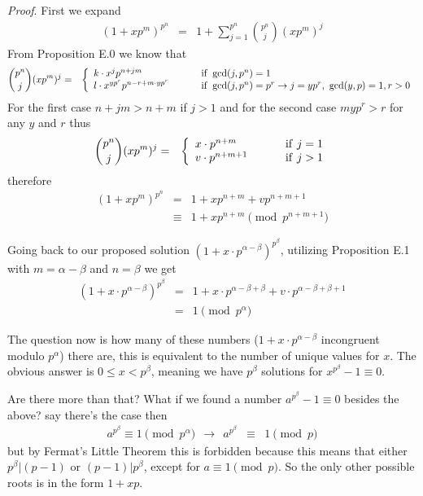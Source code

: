 \documentclass[aps,preprint,preprintnumbers,nofootinbib,showpacs,prd]{revtex4-1}
\newcommand{\nbea}{\begin{eqnarray*}}
\newcommand{\neea}{\end{eqnarray*}}
\begin{document}
{\it Proof}. First we expand 
%
\nbea
(1 + xp^m)^{p^n} & = & 1 + \sum_{j=1}^{p^n} \binom{p^n}{j} (xp^m)^j
\neea
%
From Proposition E.0 we know that 
%
\nbea
\binom{p^n}{j} (xp^m)^j & = & \left\{
\begin{array}{l l}
k\cdot x^j p^{n+jm} & ~~~~~~~ {\rm if ~} \gcd(j,p^n) = 1 \\
l\cdot x^{yp^r} p^{n-r + m\cdot yp^r} & ~~~~~~~ {\rm if ~} \gcd(j,p^n) = p^r \to j = yp^r, ~\gcd(y,p) = 1, r > 0
\end{array}\right.
\neea
%
For the first case $n+jm > n+m$ if $j > 1$ and for the second case $myp^r > r$ for any $y$ and $r$ thus
%
\nbea
\binom{p^n}{j} (xp^m)^j & = & \left\{
\begin{array}{l l}
x\cdot p^{n+m} & ~~~~~~~ {\rm if ~} j = 1 \\
v\cdot p^{n + m + 1} & ~~~~~~~ {\rm if ~} j > 1
\end{array}\right.
\neea
%
therefore
%
\nbea
(1 + xp^m)^{p^n} & = & 1 + xp^{n+m} + v p^{n + m + 1} \\
& \equiv & 1 + xp^{n+m} \pmod{p^{n + m + 1}}
\neea
%

Going back to our proposed solution $(1 + x\cdot p^{\alpha-\beta})^{p^\beta}$, utilizing Proposition E.1 with $m = \alpha-\beta$ and $n=\beta$ we get
%
\nbea
(1 + x\cdot p^{\alpha-\beta})^{p^\beta} & = & 1 + x\cdot p^{\alpha-\beta +\beta} + v\cdot p^{\alpha-\beta+\beta + 1} \\
& = & 1 \pmod{p^\alpha}
\neea
%


The question now is how many of these numbers ($1 + x\cdot p^{\alpha-\beta}$ incongruent modulo $p^\alpha$) there are, this is equivalent to the number of unique values for $x$. The obvious answer is $0 \le x < p^\beta$, meaning we have $p^\beta$ solutions for $x^{p^\beta} - 1 \equiv 0$.

Are there more than that? What if we found a number $a^{p^\beta} - 1 \equiv 0$ besides the above? say there's the case then
%
\nbea
a^{p^\beta} \equiv 1 \pmod{p^\alpha} ~~\to~~ a^{p^\beta} & \equiv & 1 \pmod{p}
\neea
%
but by Fermat's Little Theorem this is forbidden because this means that either $p^\beta|(p-1)$ or $(p-1)|p^\beta$, except for $a \equiv 1 \pmod{p}$. So the only other possible roots is in the form $1 + xp$.
\end{document}
